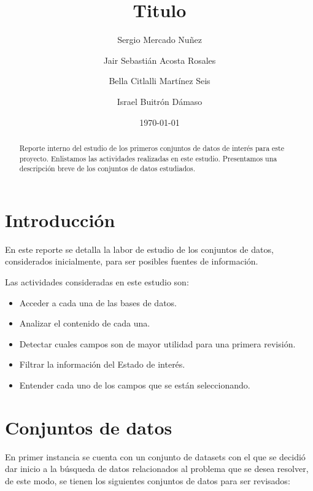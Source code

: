 \documentclass[10pt,letterpaper]{article}
\begin{document}
\title{Titulo}
\author{%
Sergio Mercado Nu\~nez
\and
Jair Sebasti\'an Acosta Rosales
\and
Bella Citlalli Mart\'inez Seis
\and
Israel Buitr\'on D\'amaso
}
\date{\today}

\maketitle

\begin{abstract}
  Reporte interno del estudio de los primeros conjuntos de datos de inter\'es para este proyecto.
  Enlistamos las actividades realizadas en este estudio.
  Presentamos una descripci\'on breve de los conjuntos de datos estudiados.
\end{abstract}

\section{Introducción} %
\label{sec:introduccion}

En este reporte se detalla la labor de estudio de los conjuntos de datos, considerados inicialmente, para ser posibles fuentes de información.

Las actividades consideradas en este estudio son:
\begin{itemize}
\item Acceder a cada una de las bases de datos.
\item Analizar el contenido de cada una. 
\item Detectar cuales campos son de mayor utilidad para una primera revisi\'on.
\item Filtrar la informaci\'on del Estado de inter\'es.
\item Entender cada uno de los campos que se est\'an seleccionando.
\end{itemize}	

%
%

\section{Conjuntos de datos} %
\label{sec:conjuntos_de_datos}

En primer instancia se cuenta con un conjunto de datasets con el que se decidi\'o dar inicio a la b\'usqueda de datos relacionados al problema que se desea resolver, de este modo, se tienen los siguientes conjuntos de datos para ser revisados:
\end{document}

